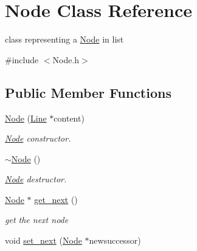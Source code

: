 \hypertarget{class_node}{
\section{\-Node \-Class \-Reference}
\label{class_node}
}


class representing a \hyperlink{class_node}{\-Node} in list  




{\ttfamily \#include $<$\-Node.\-h$>$}

\subsection*{\-Public \-Member \-Functions}
\begin{DoxyCompactItemize}
\item 
\hypertarget{class_node_a38b4c6850bd8b7f57986ab2131b09918}{
\hyperlink{class_node_a38b4c6850bd8b7f57986ab2131b09918}{\-Node} (\hyperlink{class_line}{\-Line} $\ast$content)}
\label{class_node_a38b4c6850bd8b7f57986ab2131b09918}

\begin{DoxyCompactList}\small\item\em \hyperlink{class_node}{\-Node} constructor. \end{DoxyCompactList}\item 
\hypertarget{class_node_aa0840c3cb5c7159be6d992adecd2097c}{
\hyperlink{class_node_aa0840c3cb5c7159be6d992adecd2097c}{$\sim$\-Node} ()}
\label{class_node_aa0840c3cb5c7159be6d992adecd2097c}

\begin{DoxyCompactList}\small\item\em \hyperlink{class_node}{\-Node} destructor. \end{DoxyCompactList}\item 
\hypertarget{class_node_a815c897407e2c039c4d86ef42848d8e5}{
\hyperlink{class_node}{\-Node} $\ast$ \hyperlink{class_node_a815c897407e2c039c4d86ef42848d8e5}{get\-\_\-next} ()}
\label{class_node_a815c897407e2c039c4d86ef42848d8e5}

\begin{DoxyCompactList}\small\item\em get the next node \end{DoxyCompactList}\item 
\hypertarget{class_node_ac33ed514ff8d86b658b6690279386565}{
void \hyperlink{class_node_ac33ed514ff8d86b658b6690279386565}{set\-\_\-next} (\hyperlink{class_node}{\-Node} $\ast$newsuccessor)}
\label{class_node_ac33ed514ff8d86b658b6690279386565}


\end{DoxyCompactItemize}
